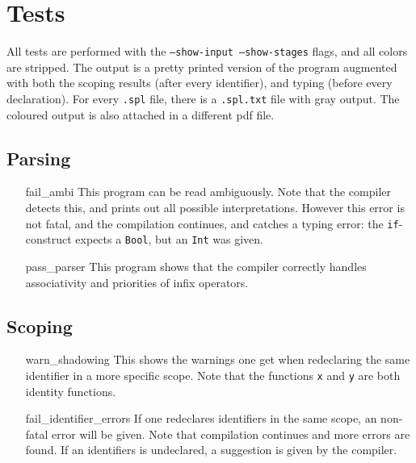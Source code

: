 \documentclass[14pt]{amsart}
\begin{document}
\section{Tests}
All tests are performed with the \texttt{--show-input --show-stages} flags, and all colors are stripped. The output is a pretty printed version of the program augmented with both the scoping results (after every identifier), and typing (before every declaration). For every \texttt{.spl} file, there is a \texttt{.spl.txt} file with gray output. The coloured output is also attached in a different pdf file.

\subsection{Parsing}
\begin{itemize}
	\item[fail\_ambi] This program can be read ambiguously. Note that the compiler detects this, and prints out all possible interpretations. However this error is not fatal, and the compilation continues, and catches a typing error: the \texttt{if}-construct expects a \texttt{Bool}, but an \texttt{Int} was given.
	\item[pass\_parser] This program shows that the compiler correctly handles associativity and priorities of infix operators.
\end{itemize}
\subsection{Scoping}
\begin{itemize}
	\item[warn\_shadowing] This shows the warnings one get when redeclaring the same identifier in a more specific scope. Note that the functions \texttt{x} and \texttt{y} are both identity functions.
	\item[fail\_identifier\_errors] If one redeclares identifiers in the same scope, an non-fatal error will be given. Note that compilation continues and more errors are found. If an identifiers is undeclared, a suggestion is given by the compiler.
\end{itemize}
\end{document}
